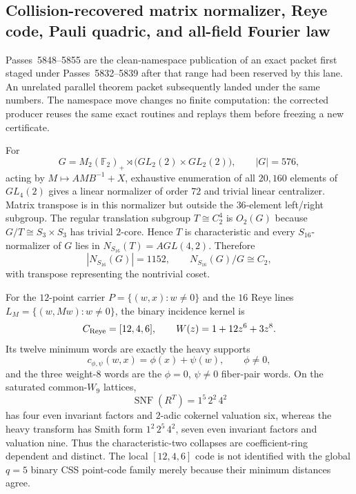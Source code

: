 \subsection*{Collision-recovered matrix normalizer, Reye code, Pauli quadric, and all-field Fourier law}

Passes~5848--5855 are the clean-namespace publication of an exact packet first
staged under Passes~5832--5839 after that range had been reserved by this lane.
An unrelated parallel theorem packet subsequently landed under the same numbers.
The namespace move changes no finite computation: the corrected producer reuses the
same exact routines and replays them before freezing a new certificate.

For
\[
G=M_2(\mathbb F_2)_+\rtimes\bigl(GL_2(2)\times GL_2(2)\bigr),
\qquad |G|=576,
\]
acting by $M\mapsto AMB^{-1}+X$, exhaustive enumeration of all $20{,}160$
elements of $GL_4(2)$ gives a linear normalizer of order $72$ and trivial
linear centralizer.  Matrix transpose is in this normalizer but outside the
$36$-element left/right subgroup.  The regular translation subgroup
$T\cong C_2^4$ is $O_2(G)$ because $G/T\cong S_3\times S_3$ has trivial
$2$-core.  Hence $T$ is characteristic and every $S_{16}$-normalizer of $G$
lies in $N_{S_{16}}(T)=AGL(4,2)$.  Therefore
\[
\boxed{|N_{S_{16}}(G)|=1152},
\qquad
\boxed{N_{S_{16}}(G)/G\cong C_2},
\]
with transpose representing the nontrivial coset.

For the $12$-point carrier $P=\{(w,x):w\ne0\}$ and the $16$ Reye lines
$L_M=\{(w,Mw):w\ne0\}$, the binary incidence kernel is
\[
C_{\rm Reye}=[12,4,6],
\qquad W(z)=1+12z^6+3z^8.
\]
Its twelve minimum words are exactly the heavy supports
\[
c_{\phi,\psi}(w,x)=\phi(x)+\psi(w),\qquad \phi\ne0,
\]
and the three weight-$8$ words are the $\phi=0$, $\psi\ne0$ fiber-pair
words.  On the saturated common-$W_9$ lattices,
\[
\operatorname{SNF}(R^T)=1^5\,2^2\,4^2
\]
has four even invariant factors and $2$-adic cokernel valuation six, whereas
the heavy transform has Smith form $1^2\,2^5\,4^2$, seven even invariant
factors and valuation nine.  Thus the characteristic-two collapses are
coefficient-ring dependent and distinct.  The local $[12,4,6]$ code is not
identified with the global $q=5$ binary CSS point-code family merely because
their minimum distances agree.

